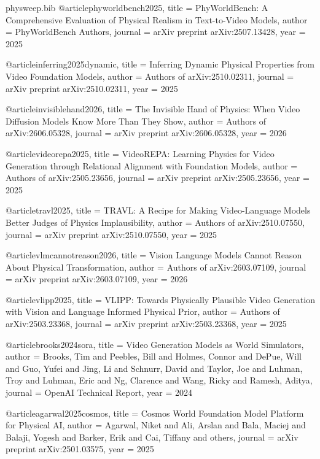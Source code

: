 \begin{filecontents}{physweep.bib}
@article{phyworldbench2025,
  title   = {{PhyWorldBench}: A Comprehensive Evaluation of Physical Realism in Text-to-Video Models},
  author  = {{PhyWorldBench Authors}},
  journal = {arXiv preprint arXiv:2507.13428},
  year    = {2025}
}

@article{inferring2025dynamic,
  title   = {Inferring Dynamic Physical Properties from Video Foundation Models},
  author  = {{Authors of arXiv:2510.02311}},
  journal = {arXiv preprint arXiv:2510.02311},
  year    = {2025}
}

@article{invisiblehand2026,
  title   = {The Invisible Hand of Physics: When Video Diffusion Models Know More Than They Show},
  author  = {{Authors of arXiv:2606.05328}},
  journal = {arXiv preprint arXiv:2606.05328},
  year    = {2026}
}

@article{videorepa2025,
  title   = {{VideoREPA}: Learning Physics for Video Generation through Relational Alignment with Foundation Models},
  author  = {{Authors of arXiv:2505.23656}},
  journal = {arXiv preprint arXiv:2505.23656},
  year    = {2025}
}

@article{travl2025,
  title   = {{TRAVL}: A Recipe for Making Video-Language Models Better Judges of Physics Implausibility},
  author  = {{Authors of arXiv:2510.07550}},
  journal = {arXiv preprint arXiv:2510.07550},
  year    = {2025}
}

@article{vlmcannotreason2026,
  title   = {Vision Language Models Cannot Reason About Physical Transformation},
  author  = {{Authors of arXiv:2603.07109}},
  journal = {arXiv preprint arXiv:2603.07109},
  year    = {2026}
}

@article{vlipp2025,
  title   = {{VLIPP}: Towards Physically Plausible Video Generation with Vision and Language Informed Physical Prior},
  author  = {{Authors of arXiv:2503.23368}},
  journal = {arXiv preprint arXiv:2503.23368},
  year    = {2025}
}

@article{brooks2024sora,
  title   = {Video Generation Models as World Simulators},
  author  = {Brooks, Tim and Peebles, Bill and Holmes, Connor and DePue, Will and Guo, Yufei and Jing, Li and Schnurr, David and Taylor, Joe and Luhman, Troy and Luhman, Eric and Ng, Clarence and Wang, Ricky and Ramesh, Aditya},
  journal = {OpenAI Technical Report},
  year    = {2024}
}

@article{agarwal2025cosmos,
  title   = {Cosmos World Foundation Model Platform for Physical AI},
  author  = {Agarwal, Niket and Ali, Arslan and Bala, Maciej and Balaji, Yogesh and Barker, Erik and Cai, Tiffany and others},
  journal = {arXiv preprint arXiv:2501.03575},
  year    = {2025}
}


\end{filecontents}
